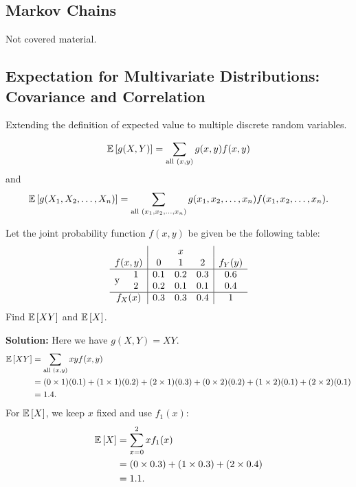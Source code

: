 \pagebreak

\subsection{Markov Chains}

Not covered material.


\subsection{Expectation for Multivariate Distributions: Covariance and Correlation}


Extending the definition of expected value to multiple discrete random variables.
\begin{definition}
    \[\mathbb{E}\left[{g(X,Y)}\right] = \displaystyle \sum_{\text{all } (x,y)} g(x,y)f(x,y)\] and
    \[\mathbb{E}\left[{g(X_1, X_2, \ldots, X_n)}\right] = \sum_{\text{all } (x_1, x_2, \ldots, x_n)} g(x_1, x_2, \ldots, x_n)f(x_1, x_2, \ldots, x_n).\]
\end{definition}

\begin{example}
    Let the joint probability function $f(x,y)$ be given be the following table:
    \[
        \begin{array}{cc|ccc|c}
            & & \multicolumn{3}{c|}{x} & \\
            \multicolumn{2}{c|}{f(x,y)} & 0 & 1 & 2 & f_Y(y) \\
            \hline
            \multirow{2}{*}{y} 
              & 1 & 0.1 & 0.2 & 0.3 & 0.6 \\
              & 2 & 0.2 & 0.1 & 0.1 & 0.4 \\
            \hline
            \multicolumn{2}{c|}{f_X(x)} & 0.3 & 0.3 & 0.4 & 1
        \end{array}
    \]
    Find $\mathbb{E}\left[{XY}\right]$ and $\mathbb{E}\left[{X}\right]$.

    \textbf{Solution:} Here we have $g(X,Y) = XY$. \vspace{-3mm}
    \begin{align*}
        \mathbb{E}\left[{XY}\right] &= \displaystyle \sum_{\text{all } (x,y)} xyf(x,y) \\
        &= (0 \times 1)(0.1) + (1 \times 1)(0.2) + (2 \times 1)(0.3) + (0 \times 2)(0.2) + (1 \times 2)(0.1) + (2 \times 2)(0.1) \\
        &= 1.4.
    \end{align*}
    \phantom{} \vspace{-2mm}
    For $\mathbb{E}\left[{X}\right]$, we keep $x$ fixed and use $f_1(x)$: \vspace{-2mm}
    \begin{align*}
        \mathbb{E}\left[{X}\right] &= \displaystyle \sum_{x=0}^{2} xf_1(x) \\
        &= (0 \times 0.3) + (1 \times 0.3) + (2 \times 0.4) \\
        &= 1.1.
    \end{align*}
\end{example}


